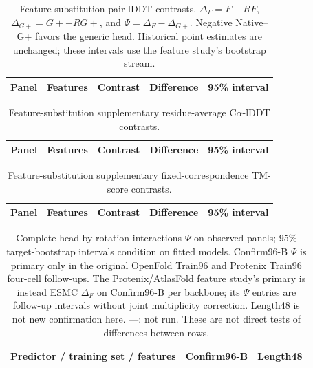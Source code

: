 \begin{table}[htbp]\centering\footnotesize
\caption{Feature-substitution pair-lDDT contrasts. $\Delta_F=F-RF$, $\Delta_{G+}=G+-RG+$,
and $\Psi=\Delta_F-\Delta_{G+}$. Negative Native--G+ favors the generic head. Historical point estimates are
unchanged; these intervals use the feature study's bootstrap stream.}
\begin{tabular}{lllrr}\toprule
Panel & Features & Contrast & Difference & 95\% interval \\\midrule

\end{tabular}\end{table}
\begin{table}[htbp]\centering\footnotesize
\caption{Feature-substitution supplementary residue-average C$\alpha$-lDDT contrasts.}
\begin{tabular}{lllrr}\toprule
Panel & Features & Contrast & Difference & 95\% interval \\\midrule

\end{tabular}\end{table}
\begin{table}[htbp]\centering\footnotesize
\caption{Feature-substitution supplementary fixed-correspondence TM-score contrasts.}
\begin{tabular}{lllrr}\toprule
Panel & Features & Contrast & Difference & 95\% interval \\\midrule

\end{tabular}\end{table}

\begin{table}[t]
\caption{Complete head-by-rotation interactions $\Psi$ on observed panels;
95\% target-bootstrap intervals condition on fitted models. Confirm96-B $\Psi$
is primary only in the original OpenFold Train96 and Protenix Train96
four-cell follow-ups. The Protenix/AtlasFold feature study's primary is instead ESMC $\Delta_F$ on Confirm96-B
per backbone; its $\Psi$ entries are follow-up intervals without joint
multiplicity correction. Length48 is not new confirmation here. ---: not run.
These are not direct tests of differences between rows.}
\label{tab:interaction_scope}\centering\footnotesize
\begin{tabular}{lll}\toprule
Predictor / training set / features & Confirm96-B & Length48 \\\midrule

\end{tabular}
\end{table}

